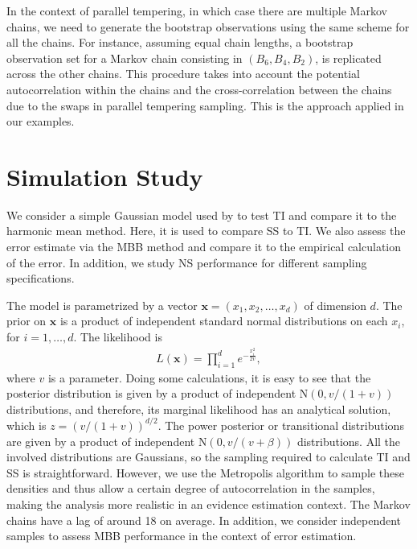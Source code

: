 \documentclass[aps,reprint,amsmath,amssymb,showpacs,showkeys]{revtex4-1}%
\begin{document}
In the context of parallel tempering, in which case there are multiple Markov chains, we need to generate the bootstrap observations using the same scheme for all the chains.  For instance, assuming equal chain lengths, a bootstrap observation set for a Markov chain consisting in $(B_6,B_4,B_2)$, is replicated across the other chains.  This procedure takes into account the potential autocorrelation within the chains and the cross-correlation between the chains due to the swaps in parallel tempering sampling.  This is the approach applied in our examples.

\section{Simulation Study} \label{sec:simulation}
We consider a simple Gaussian model used by \cite{Lartillot:Philippe:2006} to test TI and compare it to the harmonic mean method.  Here, it is used to compare SS to TI.  We also assess the error estimate via the MBB method and compare it to the empirical calculation of the error.  In addition, we study NS performance for different sampling specifications.  

The model is parametrized by a vector $\bm{x} = (x_1,x_2, \dots, x_d)$ of dimension $d$. The prior on $\bm x$ is a product of independent standard normal distributions on each $x_i$, for $i = 1, \dots,d$.  The likelihood is 
\begin{align*}
L(\bm{x}) = \prod_{i=1}^{d} e^{- \frac{x_i^2}{2v}},
\end{align*}
where $v$ is a parameter.  Doing some calculations, it is easy to see that the posterior distribution is given by a product of independent $\text{N}(0, v/(1+v))$ distributions, and therefore, its marginal likelihood has an analytical solution, which is $z = (v/(1+v))^{d/2}$.  The power posterior or transitional distributions are given by a product of independent  $\text{N}(0,v/(v+\beta))$ distributions.  All the involved distributions are Gaussians, so the sampling required to calculate TI and SS is straightforward.  However, we use the Metropolis algorithm to sample these densities and thus allow a certain degree of autocorrelation in the samples, making the analysis more realistic in an evidence estimation context.  The Markov chains have a lag of around 18 on average.  In addition, we consider independent samples to assess MBB performance in the context of error estimation.  
\end{document}
